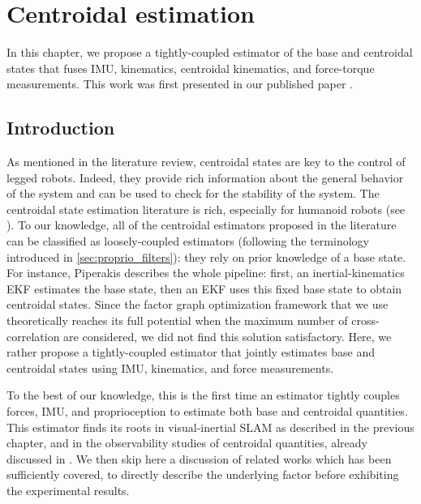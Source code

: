 \chapter{Centroidal estimation}
\label{chp:centroidal_estimation}
\minitoc
\bigskip


In this chapter, we propose a tightly-coupled estimator of the base and centroidal states that fuses IMU, kinematics, centroidal kinematics, 
and force-torque measurements. This work was first presented in our published paper \cite{fourmy2021contact}.

\section{Introduction}

As mentioned in the literature review, centroidal states are key to the control of legged robots. Indeed, they provide rich information about the general
behavior of the system and can be used to check for the stability of the system. The centroidal state estimation literature is rich, especially for humanoid
robots (see ). To our knowledge, all of the centroidal estimators proposed in the literature can be classified as loosely-coupled estimators 
(following the terminology introduced in \ref{sec:proprio_filters}): they rely on prior knowledge of a base state. For instance, Piperakis \cite{piperakis2018nonlinear} 
describes the whole pipeline: first, an inertial-kinematics EKF estimates the base state, then an EKF uses this fixed base state to obtain centroidal states. 
Since the factor graph optimization framework that we use theoretically reaches its full potential when the maximum number of cross-correlation
are considered, we did not find this solution satisfactory. Here, we rather propose a tightly-coupled estimator that jointly estimates
base and centroidal states using IMU, kinematics, and force measurements.



To the best of our knowledge, this is the first time an estimator tightly couples forces, IMU, and proprioception to estimate both base and centroidal
quantities. This estimator finds its roots in visual-inertial SLAM as described in the previous chapter,
and in the observability studies of centroidal quantities, already discussed in . We then skip here a discussion of related
works which has been sufficiently covered, to directly describe the underlying factor before exhibiting the experimental results.


